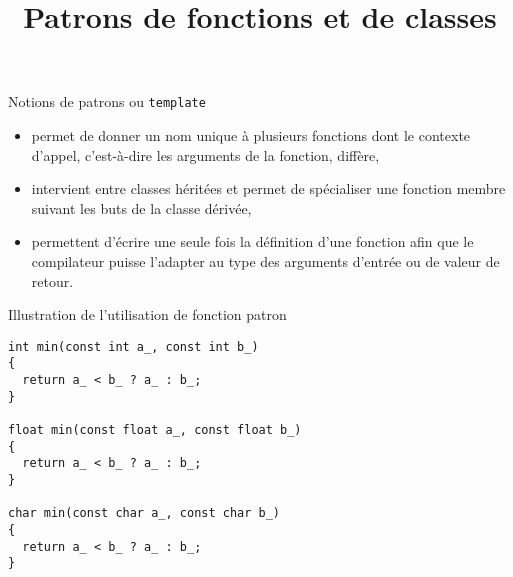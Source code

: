 \documentclass[c]{beamer}
\title{Patrons de fonctions et de classes}
\begin{document}
\maketitle

\begin{frame}[fragile,label={sec:orgheadline1}]{Notions de patrons ou \texttt{template}}
 \begin{itemize}
\item {} permet de donner un nom unique à plusieurs
fonctions dont le contexte d'appel, c'est-à-dire les arguments de la fonction,
diffère,
\end{itemize}

\pause

\begin{itemize}
\item {} intervient entre classes héritées et permet de spécialiser
une fonction membre suivant les buts de la classe dérivée,
\end{itemize}

\pause

\begin{itemize}
\item {} permettent d'écrire une seule fois la
définition d'une fonction afin que le compilateur puisse l'adapter au type des
arguments d'entrée ou de valeur de retour.
\end{itemize}
\end{frame}

\begin{frame}[fragile,label={sec:orgheadline2}]{Illustration de l'utilisation de fonction patron}
 \begin{verbatim}
int min(const int a_, const int b_)
{
  return a_ < b_ ? a_ : b_;
}

float min(const float a_, const float b_)
{
  return a_ < b_ ? a_ : b_;
}

char min(const char a_, const char b_)
{
  return a_ < b_ ? a_ : b_;
}
\end{verbatim}
\end{frame}
\end{document}
